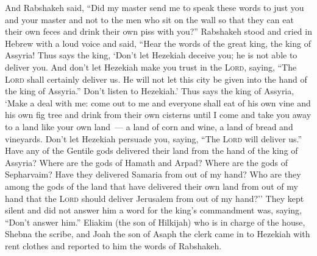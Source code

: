 \begin{inparaenum}
     And Rabshakeh said, ``Did my master send me to speak these words to just you and your master and not to the men who sit on the wall so that they can eat their own feces and drink their own piss with you?''%
     Rabshakeh stood and cried in Hebrew with a loud voice and said, ``Hear the words of the great king, the king of Assyria!%
     Thus says the king, `Don't let Hezekiah deceive you; he is not able to deliver you.%
     And don't let Hezekiah make you trust in the \textsc{Lord}, saying, ``The \textsc{Lord} shall certainly deliver us. He will not let this city be given into the hand of the king of Assyria.''%
     Don't listen to Hezekiah.' Thus says the king of Assyria, `Make a deal with me: come out to me and everyone shall eat of his own vine and his own fig tree and drink from their own cisterns%
     until I come and take you away to a land like your own land~--- a land of corn and wine, a land of bread and vineyards.%
     Don't let Hezekiah persuade you, saying, ``The \textsc{Lord} will deliver us.'' Have any of the Gentile gods delivered their land from the hand of the king of Assyria?%
     Where are the gods of Hamath and Arpad? Where are the gods of Sepharvaim? Have they delivered Samaria from out of my hand?%
     Who are they among the gods of the land that have delivered their own land from out of my hand that the \textsc{Lord} should deliver Jerusalem from out of my hand?''%
     They kept silent and did not answer him a word for the king's commandment was, saying, ``Don't answer him.''%
     Eliakim (the son of Hilkijah) who is in charge of the house, Shebna the scribe, and Joah the son of Asaph the clerk came in to Hezekiah with rent clothes and reported to him the words of Rabshakeh.%
\end{inparaenum}
